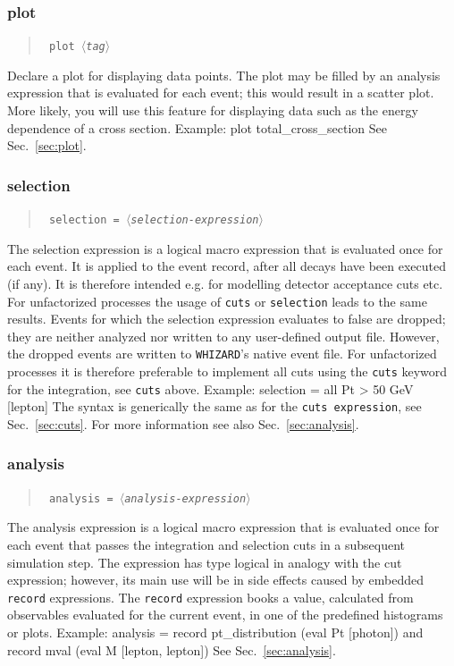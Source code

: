 \documentclass[12pt]{book}
\newenvironment{code}%
  {\begingroup\footnotesize
   \quote
   \verbatim}%
  {\endverbatim
   \endquote
   \endgroup\noindent}
\newenvironment{syntax}%
  {\begin{quote}
   \begin{flushleft}\tt}%
  {\end{flushleft}
   \end{quote}}
\newcommand{\var}[1]{$\langle$\textit{#1}$\rangle$}
\newcommand{\ttt}[1]{\texttt{#1}}
\newcommand{\whizard}{\texttt{WHIZARD}}
\begin{document}
\subsubsection{plot}
\begin{syntax}
plot \var{tag}
\end{syntax}
Declare a plot for displaying data points.  The plot may be filled by an
analysis expression that is evaluated for each event; this would result in a
scatter plot.  More likely, you will use this feature for displaying data such
as the energy dependence of a cross section.  Example:
\begin{code}
plot total_cross_section
\end{code}
See Sec.~\ref{sec:plot}.


\subsubsection{selection}
\begin{syntax}
selection = \var{selection-expression}
\end{syntax}
The selection expression is a logical macro expression that is evaluated once
for each event. It is applied to the event record,
after all decays have been executed (if any). It is therefore intended
e.g. for modelling detector acceptance cuts etc. For unfactorized
processes the usage of \texttt{cuts} or \texttt{selection} leads to
the same results. Events for which the selection expression evaluates
to false are dropped; they are neither analyzed nor written to any
user-defined output file. However, the dropped events are written to
\whizard's native event file. For unfactorized processes it is
therefore preferable to implement all cuts using the \texttt{cuts}
keyword for the integration, see \texttt{cuts} above. 
Example:
\begin{code}
selection = all Pt > 50 GeV [lepton]
\end{code}
The syntax is generically the same as for the \texttt{cuts
expression}, see Sec.~\ref{sec:cuts}. For more information see also
Sec.~\ref{sec:analysis}.


\subsubsection{analysis}
\begin{syntax}
analysis = \var{analysis-expression}
\end{syntax}
The analysis expression is a logical macro expression that is evaluated once
for each event that passes the integration and selection cuts in a
subsequent simulation step.  The
expression has type logical in analogy with the cut expression; however, its
main use will be in side effects caused by embedded \ttt{record} expressions.
The \ttt{record} expression books a value, calculated from observables
evaluated for the current event, in one of the predefined histograms or plots.
Example:
\begin{code}
analysis = record pt_distribution (eval Pt [photon])
      and  record mval (eval M [lepton, lepton])
\end{code}
See Sec.~\ref{sec:analysis}.
\end{document}
